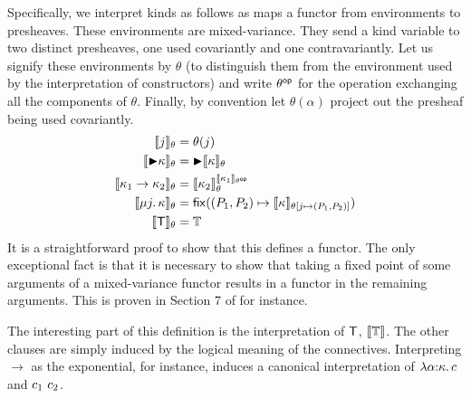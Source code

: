 Specifically, we interpret kinds as follows as maps a functor from
environments to presheaves. These environments are mixed-variance.
They send a kind variable to two distinct presheaves, one
used covariantly and one contravariantly. Let us signify these
environments by $\theta$ (to distinguish them from the
environment used by the interpretation of constructors) and write
$\theta^{\mathsf{op}}$ for the operation exchanging all the components of
$\theta$. Finally, by convention let $\theta(\alpha)$ project out the
presheaf being used covariantly.
\begin{align*}
  \llbracket j \rrbracket_\theta &= \theta(j)\\
  \llbracket {\blacktriangleright} \kappa \rrbracket_\theta &= {\blacktriangleright} \llbracket \kappa \rrbracket_\theta\\
  \llbracket \kappa_1 \to \kappa_2 \rrbracket_\theta &= \llbracket \kappa_2 \rrbracket_\theta^{\llbracket \kappa_1 \rrbracket_{\theta^{\mathsf{op}}}}\\
  \llbracket \mu j.\, \kappa \rrbracket_\theta &= \mathsf{fix}((P_1, P_2) \mapsto \llbracket \kappa \rrbracket_{\theta[j \mapsto (P_1, P_2)]})\\
  \llbracket \mathsf{T} \rrbracket_\theta &= \mathbb{T}\\
\end{align*}
It is a straightforward proof to show that this defines a functor. The
only exceptional fact is that it is necessary to show that taking a
fixed point of some arguments of a mixed-variance functor results in a
functor in the remaining arguments. This is proven in Section 7 of
\citet{Birkedal:steps:11} for instance.

The interesting part of this definition is the interpretation of
$\mathsf{T}$, $\llbracket \mathbb{T} \rrbracket$. The other clauses are simply induced by the
logical meaning of the connectives. Interpreting $\to$ as the
exponential, for instance, induces a canonical interpretation of
$\lambda \alpha {:} \kappa.\, c$ and $c_1\ c_2$.

